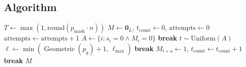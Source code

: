 \documentclass[11pt]{article}
\newcommand{\pmask}{p_{\text{mask}}}
\DeclareMathOperator{\Geom}{Geometric}
\begin{document}
\subsection{Algorithm}
\begin{algorithm}[H]
\caption{Span Masking}
\begin{algorithmic}[1]
\State $T \gets \max(1, \text{round}(\pmask \cdot n))$
\State $M \gets \mathbf{0}_L$, $t_{\text{count}} \gets 0$, $\text{attempts} \gets 0$
  \State $\text{attempts} \gets \text{attempts} + 1$
  \State $A \gets \{i : s_i = 0 \wedge M_i = 0\}$
   \textbf{break} \EndIf
  \State $t \sim \text{Uniform}(A)$
  \State $\ell \gets \min(\Geom(p_g) + 1,\, \ell_{\max})$
     \textbf{break} \EndIf
      \State $M_{t+o} \gets 1$, $t_{\text{count}} \gets t_{\text{count}} + 1$
       \textbf{break} \EndIf
    \EndIf
  \EndFor
\EndWhile
\State \Return $M$
\end{algorithmic}
\end{algorithm}
\end{document}
